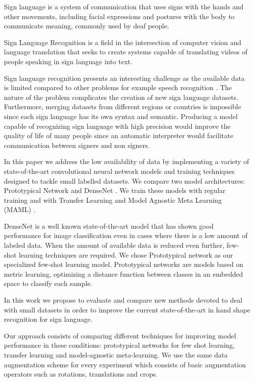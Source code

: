 \noindent Sign language is a system of communication that uses signs with the hands and other movements, including facial expressions and postures with the body to communicate meaning, commonly used by deaf people.

Sign Language Recognition is a field in the intersection of computer vision and language translation that seeks to create systems capable of translating videos of people speaking in sign language into text.

Sign language recognition presents an interesting challenge as the available data is limited compared to other problems for example speech recognition \cite{bragg2019}. The nature of the problem complicates the creation of new sign language datasets. Furthermore, merging datasets from different regions or countries is impossible since each sign language has its own syntax and semantic. Producing a model capable of recognizing sign language with high precision would improve the quality of life of many people since an automatic interpreter would facilitate communication between signers and non signers.

In this paper we address the low availability of data by implementing a variety of state-of-the-art convolutional neural network models and training techniques designed to tackle small labelled datasets. We compare two model architectures: Prototypical Network \cite{protonet} and DenseNet \cite{densenet}. We train these models with regular training and with Transfer Learning and Model Agnostic Meta Learning (MAML) \cite{DBLP:journals/corr/FinnAL17}.

DenseNet is a well known state-of-the-art model that has shown good performance for image classification even in cases where there is a low amount of labeled data\cite{densenet}. When the amount of available data is reduced even further, few-shot learning techniques are required. We chose Prototypical network as our specialized few-shot learning model. Prototypical networks are models based on metric learning, optimizing a distance function between classes in an embedded space to classify each sample.

In this work we propose to evaluate and compare new methods devoted to deal with small datasets in order to improve the current state-of-the-art in hand shape recognition for sign language.

Our approach consists of comparing different techniques for improving model performance in these conditions: prototypical networks for few shot learning,  transfer learning and model-agnostic meta-learning. We use the same data augmentation scheme for every experiment which consists of basic augmentation operators such as rotations, translations  and crops.

